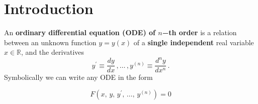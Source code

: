 \documentclass[11pt,a4paper,twoside]{article}
\begin{document}
	\pagestyle{empty}
	\mytitle

	\section*{Introduction}
	An \textbf{ordinary differential equation (ODE) of $n$−th order} is a relation between an unknown function $y = y(x)$ of a \textbf{single independent} real variable $x \in \mathbb{R}$, and the derivatives
	$$
	y^\prime \equiv \frac{dy}{dx}\, ,\ldots \, , y^{(n)} \equiv \frac{d^ny}{dx^n}\, .
	$$
	Symbolically we can write any ODE in the form

	\begin{equation}
		F(x,\, y,\, y^\prime,\, \ldots,\, y^{(n)}) = 0
	\end{equation}
\end{document}
